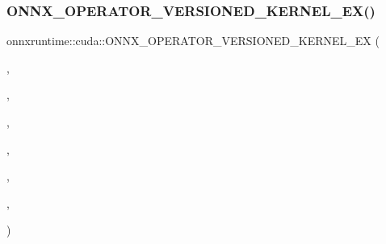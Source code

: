 \subsubsection{\texorpdfstring{O\+N\+N\+X\+\_\+\+O\+P\+E\+R\+A\+T\+O\+R\+\_\+\+V\+E\+R\+S\+I\+O\+N\+E\+D\+\_\+\+K\+E\+R\+N\+E\+L\+\_\+\+E\+X()}{ONNX\_OPERATOR\_VERSIONED\_KERNEL\_EX()}}
{\footnotesize\ttfamily onnxruntime\+::cuda\+::\+O\+N\+N\+X\+\_\+\+O\+P\+E\+R\+A\+T\+O\+R\+\_\+\+V\+E\+R\+S\+I\+O\+N\+E\+D\+\_\+\+K\+E\+R\+N\+E\+L\+\_\+\+EX (\begin{DoxyParamCaption}\item[{\mbox{\hyperlink{classonnxruntime_1_1cuda_1_1Reshape__1}{Reshape\+\_\+1}}}]{,  }\item[{\mbox{\hyperlink{namespaceonnxruntime_ac0e7c0c106a2c9e9594560a3ab289fa0}{k\+Onnx\+Domain}}}]{,  }\item[{1}]{,  }\item[{4}]{,  }\item[{\mbox{\hyperlink{namespaceonnxruntime_a73ebc64887ddd1968e3cef47ffefe35b}{k\+Cuda\+Execution\+Provider}}}]{,  }\item[{\mbox{\hyperlink{classonnxruntime_1_1KernelDefBuilder}{Kernel\+Def\+Builder}}() .Alias(0, 0) .Type\+Constraint(\char`\"{}T\char`\"{}, Data\+Type\+Impl\+::\+All\+Fixed\+Size\+Tensor\+Types())}]{,  }\item[{\mbox{\hyperlink{classonnxruntime_1_1cuda_1_1Reshape__1}{Reshape\+\_\+1}}}]{ }\end{DoxyParamCaption})}

\mbox{\label{namespaceonnxruntime_1_1cuda_a6e7fa1335cee837695d13dc95ee8544a}} 
